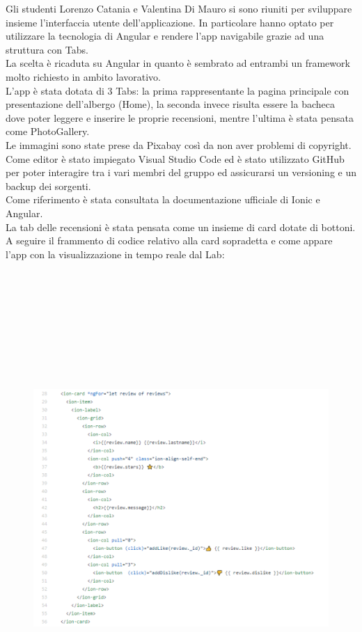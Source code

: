 \documentclass{article}[12pt]
\begin{document}
{Gli studenti Lorenzo Catania e Valentina Di Mauro si sono riuniti per sviluppare insieme l'interfaccia utente dell'applicazione. In particolare hanno optato per utilizzare la tecnologia di Angular e rendere l'app navigabile grazie ad una struttura con Tabs.\\ La scelta è ricaduta su Angular in quanto è sembrato ad entrambi un framework molto richiesto in ambito lavorativo. \\
L'app è stata dotata di 3 Tabs: la prima rappresentante la pagina principale con presentazione dell'albergo (Home), la seconda invece risulta essere la bacheca dove poter leggere e inserire le proprie recensioni, mentre l'ultima è stata pensata come PhotoGallery.\\ Le immagini sono state prese da Pixabay così da non aver problemi di copyright. 
Come editor è stato impiegato Visual Studio Code ed è stato utilizzato GitHub per poter interagire tra i vari membri del gruppo ed assicurarsi un versioning e un backup dei sorgenti.\\ 
Come riferimento è stata consultata la documentazione ufficiale di Ionic e Angular.\\ La tab delle recensioni è stata pensata come un insieme di card dotate di bottoni. 
A seguire il frammento di codice relativo alla card sopradetta e come appare l'app con la visualizzazione in tempo reale dal Lab:\\
\begin{figure}
	\includegraphics[height=18cm, width=\columnwidth]{img/codicecard.png}
\end{figure}




}
\end{document}
